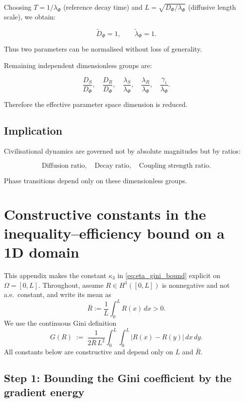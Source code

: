 \documentclass[12pt,a4paper]{article}
\theoremstyle{definition}
\begin{document}
Choosing $T = 1/\lambda_\Phi$ (reference decay time) and 
$L = \sqrt{D_\Phi/\lambda_\Phi}$ (diffusive length scale),
we obtain:

\[
\tilde{D}_\Phi = 1,
\qquad
\tilde{\lambda}_\Phi = 1.
\]

Thus two parameters can be normalised without loss of generality.

Remaining independent dimensionless groups are:

\[
\frac{D_S}{D_\Phi},
\quad
\frac{D_R}{D_\Phi},
\quad
\frac{\lambda_S}{\lambda_\Phi},
\quad
\frac{\lambda_R}{\lambda_\Phi},
\quad
\frac{\gamma_i}{\lambda_\Phi}.
\]

Therefore the effective parameter space dimension is reduced.

\subsection*{Implication}

Civilisational dynamics are governed not by absolute magnitudes
but by ratios:

\[
\text{Diffusion ratio}, \quad
\text{Decay ratio}, \quad
\text{Coupling strength ratio}.
\]

Phase transitions depend only on these dimensionless groups.

\section{Constructive constants in the inequality--efficiency bound on a 1D domain}
\label{app:kappa3_constructive}

This appendix makes the constant $\kappa_3$ in \eqref{eq:eta_gini_bound}
explicit on $\Omega=[0,L]$.
Throughout, assume $R\in H^1([0,L])$ is nonnegative and not a.e.\ constant, and
write its mean as
\[
\bar R := \frac{1}{L}\int_0^L R(x)\,dx > 0.
\]
We use the continuous Gini definition
\begin{equation}
  G(R) \;:=\; \frac{1}{2\bar R\,L^2}\int_0^L\int_0^L |R(x)-R(y)|\,dx\,dy.
  \label{eq:gini_continuous}
\end{equation}
All constants below are constructive and depend only on $L$ and $\bar R$.

\subsection{Step 1: Bounding the Gini coefficient by the gradient energy}
\end{document}
